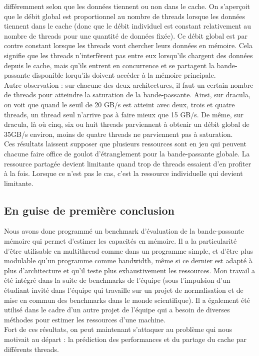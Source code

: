 \documentclass{report}
\begin{document}
différemment selon que les données tiennent ou non dans le cache. On s'aperçoit que le débit global est 
proportionnel au nombre de threads lorsque les données tiennent dans le cache (donc que le débit 
individuel est constant relativement au nombre de threads pour une quantité de données fixée). Ce débit
global est par contre constant lorsque les threads vont chercher leurs données en mémoire. Cela signifie
que les threads n'interfèrent pas entre eux lorsqu'ils chargent des données depuis le cache, 
mais qu'ils entrent en concurrence et se partagent la bande-passante disponible lorqu'ils doivent 
accéder à la mémoire principale.
\\Autre observation : sur chacune des deux architectures, il faut un certain nombre de threads pour
atteindre la saturation de la bande-passante. Ainsi, sur dracula, on voit que quand le seuil de
20 GB/s est atteint avec deux, trois et quatre threads, un thread seul n'arrive pas à faire
mieux que 15 GB/s. De même, sur dracula, là où cinq, six ou huit threads parviennent à obtenir
un débit global de 35GB/s environ, moins de quatre threads ne parviennent pas à saturation.
\\Ces résultats laissent supposer que plusieurs ressources sont en jeu qui peuvent chacune
faire office de goulot d'étranglement pour la bande-passante globale. La ressource partagée devient
limitante quand trop de threads essaient d'en profiter à la fois. Lorsque ce n'est pas le cas,
c'est la ressource individuelle qui devient limitante. 
\subsection{En guise de première conclusion }
Nous avons donc programmé un benchmark d'évaluation de la bande-passante mémoire qui permet 
d'estimer les capacités en mémoire. Il a la particularité d'être utilisable en multithread
comme dans un programme simple, et d'être plus modulable qu'un programme comme bandwidth, même
si ce dernier est adapté à plus d'architecture et qu'il teste plus exhaustivement les ressources.
Mon travail a été intégré dans la suite de benchmarks de l'équipe (sous l'impulsion d'un étudiant 
invité dans l'équipe qui travaille sur un projet de normalisation et de mise en commun des benchmarks 
dans le monde scientifique). Il a également été utilisé dans le cadre d'un autre projet de l'équipe
qui a besoin de diverses méthodes pour estimer les ressources d'une machine.
\\Fort de ces résultats, on peut maintenant s'attaquer au problème qui nous motivait
au départ : la prédiction des performances et du partage du cache par différents threads.
\end{document}
